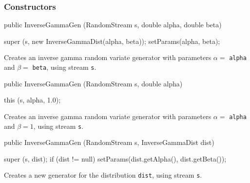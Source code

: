 \subsubsection* {Constructors}
\begin{code}

   public InverseGammaGen (RandomStream s, double alpha, double beta) \begin{hide} {
      super (s, new InverseGammaDist(alpha, beta));
      setParams(alpha, beta);
   }\end{hide}
\end{code}
\begin{tabb} Creates an inverse gamma random variate generator with parameters
  $\alpha =$ \texttt{alpha} and $\beta =$ \texttt{beta}, using stream \texttt{s}.
\end{tabb}
\begin{code}

   public InverseGammaGen (RandomStream s, double alpha) \begin{hide} {
      this (s, alpha, 1.0);
   }\end{hide}
\end{code}
\begin{tabb} Creates an inverse gamma random variate generator with parameters
 $\alpha =$ \texttt{alpha} and $\beta = 1$, using stream \texttt{s}.
\end{tabb}
\begin{code}

   public InverseGammaGen (RandomStream s, InverseGammaDist dist) \begin{hide} {
      super (s, dist);
      if (dist != null)
         setParams(dist.getAlpha(), dist.getBeta());
   }\end{hide}
\end{code}
\begin{tabb} Creates a new generator for the distribution \texttt{dist},
   using stream \texttt{s}.
\end{tabb}

